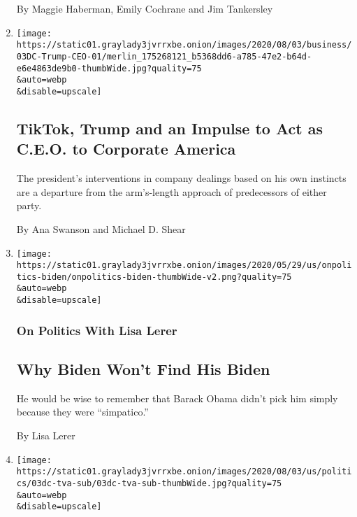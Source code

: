 \begin{enumerate}
  By Maggie Haberman, Emily Cochrane and Jim Tankersley
\item
  \href{/2020/08/03/business/economy/trump-tiktok-china-business.html}{}

  \texttt{[image: https://static01.graylady3jvrrxbe.onion/images/2020/08/03/business/03DC-Trump-CEO-01/merlin\_175268121\_b5368dd6-a785-47e2-b64d-e6e4863de9b0-thumbWide.jpg?quality=75\\\&auto=webp\\\&disable=upscale]}

  \hypertarget{tiktok-trump-and-an-impulse-to-act-as-ceo-to-corporate-america}{%
  \subsection{TikTok, Trump and an Impulse to Act as C.E.O. to Corporate
  America}\label{tiktok-trump-and-an-impulse-to-act-as-ceo-to-corporate-america}}

  The president's interventions in company dealings based on his own
  instincts are a departure from the arm's-length approach of
  predecessors of either party.

  By Ana Swanson and Michael D. Shear
\item
  \href{/2020/08/03/us/politics/joe-biden-vp.html}{}

  \texttt{[image: https://static01.graylady3jvrrxbe.onion/images/2020/05/29/us/onpolitics-biden/onpolitics-biden-thumbWide-v2.png?quality=75\\\&auto=webp\\\&disable=upscale]}

  \hypertarget{on-politics-with-lisa-lerer}{%
  \subsubsection{On Politics With Lisa
  Lerer}\label{on-politics-with-lisa-lerer}}

  \hypertarget{why-biden-wont-find-his-biden}{%
  \subsection{Why Biden Won't Find His
  Biden}\label{why-biden-wont-find-his-biden}}

  He would be wise to remember that Barack Obama didn't pick him simply
  because they were ``simpatico.''

  By Lisa Lerer
\item
  \href{/2020/08/03/us/politics/trump-tennessee-valley-authority.html}{}

  \texttt{[image: https://static01.graylady3jvrrxbe.onion/images/2020/08/03/us/politics/03dc-tva-sub/03dc-tva-sub-thumbWide.jpg?quality=75\\\&auto=webp\\\&disable=upscale]}


\end{enumerate}
